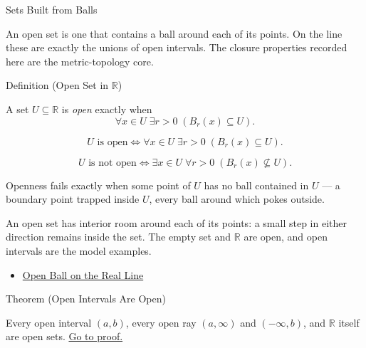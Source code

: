 \label{sec:open-sets}

\begin{topicbox}{Sets Built from Balls}
\begin{exposition}
An open set is one that contains a ball around each of its points. On the line these are exactly the unions of open intervals. The closure properties recorded here are the metric-topology core.
\end{exposition}
\end{topicbox}
\begin{definitionbox}{Definition (Open Set in $\mathbb{R}$)}
\begin{definition}
\label{def:open-set}
A set $U\subseteq\mathbb{R}$ is \emph{open} exactly when
\[
\forall x\in U\;\exists r>0\;(B_{r}(x)\subseteq U).
\]
\end{definition}
\end{definitionbox}
\begin{remark*}
\[
U \text{ is open} \Longleftrightarrow \forall x\in U\;\exists r>0\;(B_{r}(x)\subseteq U).
\]
\end{remark*}
\begin{remark*}
\[
U \text{ is not open} \Longleftrightarrow \exists x\in U\;\forall r>0\;(B_{r}(x)\not\subseteq U).
\]
\end{remark*}
\begin{remark*}
Openness fails exactly when some point of $U$ has no ball contained in $U$ --- a boundary point trapped inside $U$, every ball around which pokes outside.
\end{remark*}
\begin{remark*}[Interpretation]
An open set has interior room around each of its points: a small step in either direction remains inside the set. The empty set and $\mathbb{R}$ are open, and open intervals are the model examples.
\end{remark*}
\begin{dependencies}
\begin{itemize}
  \item \hyperref[def:open-ball]{Open Ball on the Real Line}
\end{itemize}
\end{dependencies}
\begin{theorembox}{Theorem (Open Intervals Are Open)}
\begin{theorem}
\label{thm:open-interval-is-open}
Every open interval $(a,b)$, every open ray $(a,\infty)$ and $(-\infty,b)$, and $\mathbb{R}$ itself are open sets.
\hyperref[prf:open-interval-is-open]{Go to proof.}
\end{theorem}
\end{theorembox}
